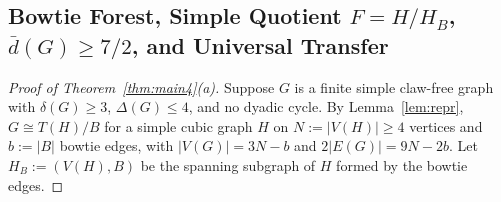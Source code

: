 \documentclass[11pt,reqno]{amsart}
\theoremstyle{plain}
\theoremstyle{definition}
\theoremstyle{remark}
\DeclareRobustCommand{\_}{\ifmmode\text{\textunderscore}\else\textunderscore\allowbreak\fi}
\begin{document}
\subsection{Bowtie Forest, Simple Quotient \texorpdfstring{$F = H/H_B$}{F = H/HB}, \texorpdfstring{$\bar{d}(G) \ge 7/2$}{d-avg >= 7/2}, and Universal Transfer}\label{subsec:bowtie-forest}

\begin{proof}[Proof of Theorem~\ref{thm:main4}(a)]
Suppose $G$ is a finite simple claw-free graph with $\delta(G) \ge 3$, $\Delta(G) \le 4$, and no dyadic cycle. By Lemma~\ref{lem:repr}, $G \cong T(H)/B$ for a simple cubic graph $H$ on $N := |V(H)| \ge 4$ vertices and $b := |B|$ bowtie edges, with $|V(G)| = 3N - b$ and $2|E(G)| = 9N - 2b$. Let $H_B := (V(H), B)$ be the spanning subgraph of $H$ formed by the bowtie edges.


\end{proof}
\end{document}
